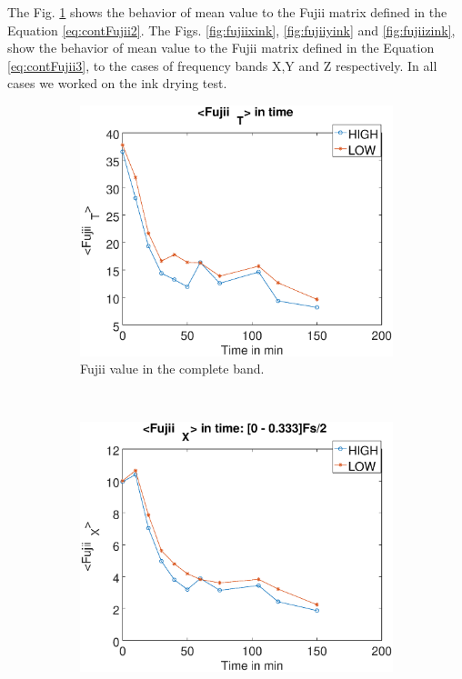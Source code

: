 \documentclass[review]{elsarticle}
\begin{document}
The Fig. \ref{fig:fujiiallink} shows the behavior of mean value to the Fujii matrix
defined in the Equation \ref{eq:contFujii2}.
The Figs. \ref{fig:fujiixink}, \ref{fig:fujiiyink} and \ref{fig:fujiizink},
show the behavior of mean value to the Fujii matrix defined in the Equation \ref{eq:contFujii3},
to the cases of frequency bands X,Y and Z respectively. In all cases we worked on the ink drying test.
\begin{figure}[!h]
    \centering
    \begin{subfigure}[b]{0.475\textwidth}
        \includegraphics[width=\textwidth]{fujii-all.eps}
	\caption{Fujii value in the complete band.}
        \label{fig:fujiiallink}
    \end{subfigure}
    ~
    \begin{subfigure}[b]{0.475\textwidth}
        \includegraphics[width=\textwidth]{fujii-bandx.eps}

\end{subfigure}
\end{figure}
\end{document}
